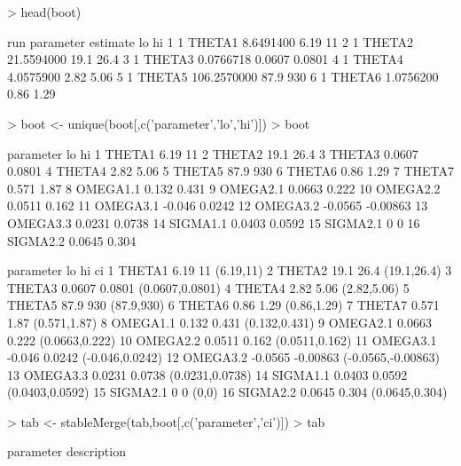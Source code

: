 \begin{Schunk}
\begin{Sinput}
> head(boot)
\end{Sinput}
\begin{Soutput}
  run parameter    estimate     lo     hi
1   1    THETA1   8.6491400   6.19     11
2   1    THETA2  21.5594000   19.1   26.4
3   1    THETA3   0.0766718 0.0607 0.0801
4   1    THETA4   4.0575900   2.82   5.06
5   1    THETA5 106.2570000   87.9    930
6   1    THETA6   1.0756200   0.86   1.29
\end{Soutput}
\begin{Sinput}
> boot <- unique(boot[,c('parameter','lo','hi')])
> boot
\end{Sinput}
\begin{Soutput}
   parameter      lo       hi
1     THETA1    6.19       11
2     THETA2    19.1     26.4
3     THETA3  0.0607   0.0801
4     THETA4    2.82     5.06
5     THETA5    87.9      930
6     THETA6    0.86     1.29
7     THETA7   0.571     1.87
8   OMEGA1.1   0.132    0.431
9   OMEGA2.1  0.0663    0.222
10  OMEGA2.2  0.0511    0.162
11  OMEGA3.1  -0.046   0.0242
12  OMEGA3.2 -0.0565 -0.00863
13  OMEGA3.3  0.0231   0.0738
14  SIGMA1.1  0.0403   0.0592
15  SIGMA2.1       0        0
16  SIGMA2.2  0.0645    0.304
\end{Soutput}
\begin{Soutput}
   parameter      lo       hi                 ci
1     THETA1    6.19       11          (6.19,11)
2     THETA2    19.1     26.4        (19.1,26.4)
3     THETA3  0.0607   0.0801    (0.0607,0.0801)
4     THETA4    2.82     5.06        (2.82,5.06)
5     THETA5    87.9      930         (87.9,930)
6     THETA6    0.86     1.29        (0.86,1.29)
7     THETA7   0.571     1.87       (0.571,1.87)
8   OMEGA1.1   0.132    0.431      (0.132,0.431)
9   OMEGA2.1  0.0663    0.222     (0.0663,0.222)
10  OMEGA2.2  0.0511    0.162     (0.0511,0.162)
11  OMEGA3.1  -0.046   0.0242    (-0.046,0.0242)
12  OMEGA3.2 -0.0565 -0.00863 (-0.0565,-0.00863)
13  OMEGA3.3  0.0231   0.0738    (0.0231,0.0738)
14  SIGMA1.1  0.0403   0.0592    (0.0403,0.0592)
15  SIGMA2.1       0        0              (0,0)
16  SIGMA2.2  0.0645    0.304     (0.0645,0.304)
\end{Soutput}
\begin{Sinput}
> tab <- stableMerge(tab,boot[,c('parameter','ci')])
> tab
\end{Sinput}
\begin{Soutput}
   parameter                                   description

\end{Soutput}
\end{Schunk}
